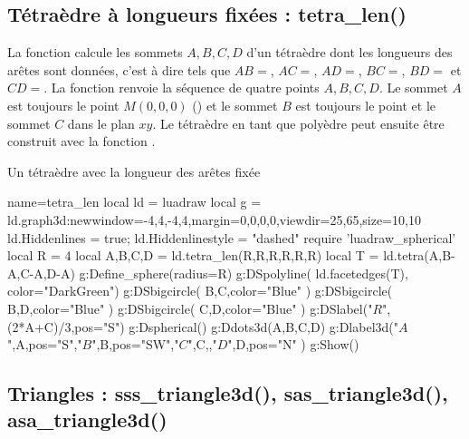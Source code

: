 \subsection{Tétraèdre à longueurs fixées : tetra\_len()}

La fonction  calcule les sommets $A,B,C,D$ d'un tétraèdre dont les longueurs des arêtes sont données, c'est à dire tels que $AB=$, $AC=$, $AD=$, $BC=$, $BD=$ et $CD=$. La fonction renvoie la séquence de quatre points $A,B,C,D$. Le sommet $A$ est toujours le point $M(0,0,0)$ () et le sommet $B$ est toujours le point  et le sommet $C$ dans le plan $xy$. Le tétraèdre en tant que polyèdre peut ensuite être construit avec la fonction .

\begin{demo}{Un tétraèdre avec la longueur des arêtes fixée}
\begin{luadraw}{name=tetra_len}
local ld = luadraw
local g = ld.graph3d:new{window={-4,4,-4,4},margin={0,0,0,0},viewdir={25,65},size={10,10}}
ld.Hiddenlines = true; ld.Hiddenlinestyle = "dashed"
require 'luadraw_spherical'
local R = 4
local A,B,C,D = ld.tetra_len(R,R,R,R,R,R)
local T = ld.tetra(A,B-A,C-A,D-A)
g:Define_sphere({radius=R})
g:DSpolyline( ld.facetedges(T), {color="DarkGreen"})
g:DSbigcircle( {B,C},{color="Blue"} )
g:DSbigcircle( {B,D},{color="Blue"} )
g:DSbigcircle( {C,D},{color="Blue"}  )
g:DSlabel("$R$",(2*A+C)/3,{pos="S"})
g:Dspherical()
g:Ddots3d({A,B,C,D})
g:Dlabel3d("$A$",A,{pos="S"},"$B$",B,{pos="SW"},"$C$",C,{},"$D$",D,{pos="N"} )
g:Show()
\end{luadraw}
\end{demo}

\subsection{Triangles : sss\_triangle3d(), sas\_triangle3d(), asa\_triangle3d()}

